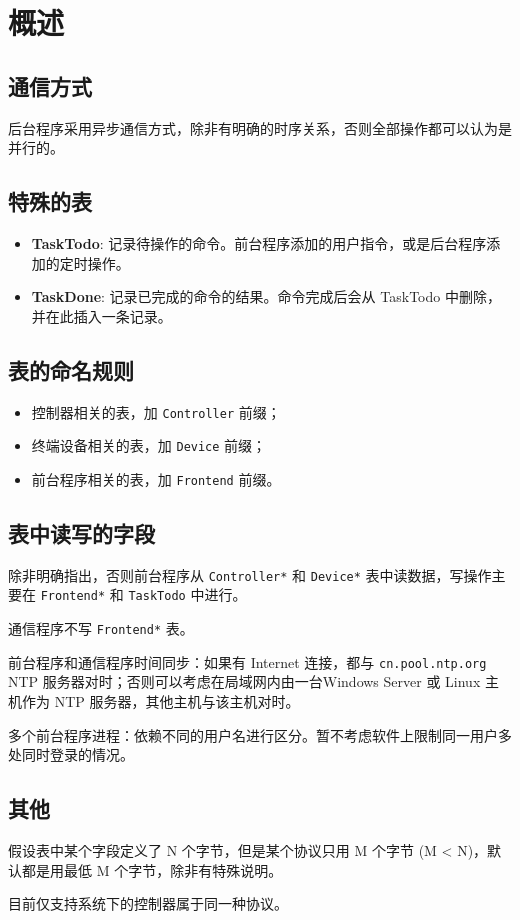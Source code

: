 \section{概述}\label{ux6982ux8ff0}

\subsection{通信方式}\label{ux901aux4fe1ux65b9ux5f0f}

后台程序采用异步通信方式，除非有明确的时序关系，否则全部操作都可以认为是并行的。

\subsection{特殊的表}\label{ux7279ux6b8aux7684ux8868}

\begin{itemize}
\item
  \textbf{TaskTodo}:
  记录待操作的命令。前台程序添加的用户指令，或是后台程序添加的定时操作。
\item
  \textbf{TaskDone}: 记录已完成的命令的结果。命令完成后会从 TaskTodo
  中删除，并在此插入一条记录。
\end{itemize}

\subsection{表的命名规则}\label{ux8868ux7684ux547dux540dux89c4ux5219}

\begin{itemize}
\itemsep1pt\parskip0pt
\item
  控制器相关的表，加 \texttt{Controller} 前缀；
\item
  终端设备相关的表，加 \texttt{Device} 前缀；
\item
  前台程序相关的表，加 \texttt{Frontend} 前缀。
\end{itemize}

\subsection{表中读写的字段}\label{ux8868ux4e2dux8bfbux5199ux7684ux5b57ux6bb5}

除非明确指出，否则前台程序从 \texttt{Controller*} 和 \texttt{Device*}
表中读数据，写操作主要在 \texttt{Frontend*} 和 \texttt{TaskTodo}
中进行。

通信程序不写 \texttt{Frontend*} 表。

前台程序和通信程序时间同步：如果有 Internet 连接，都与
\texttt{cn.pool.ntp.org} NTP
服务器对时；否则可以考虑在局域网内由一台Windows Server 或 Linux 主机作为
NTP 服务器，其他主机与该主机对时。

多个前台程序进程：依赖不同的用户名进行区分。暂不考虑软件上限制同一用户多处同时登录的情况。

\subsection{其他}\label{ux5176ux4ed6}

假设表中某个字段定义了 N 个字节，但是某个协议只用 M 个字节 (M
\textless{} N)，默认都是用最低 M 个字节，除非有特殊说明。

目前仅支持系统下的控制器属于同一种协议。
